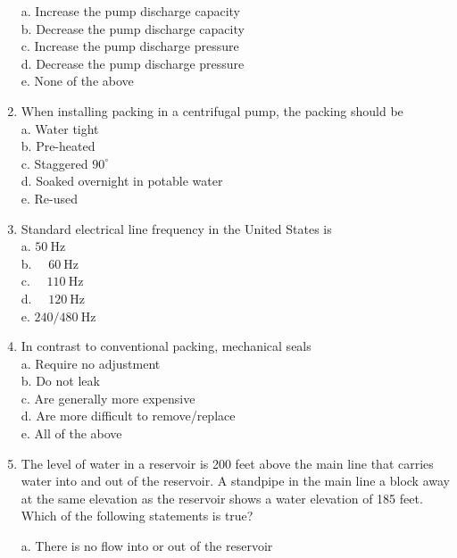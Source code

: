 \begin{enumerate}[1.]
a. Increase the pump discharge capacity\\

b. Decrease the pump discharge capacity\\

c. Increase the pump discharge pressure\\

d. Decrease the pump discharge pressure\\

e. None of the above

\item When installing packing in a centrifugal pump, the packing should be\\
a. Water tight\\
b. Pre-heated\\
c. Staggered $90^{\circ}$\\
d. Soaked overnight in potable water\\
e. Re-used\\

  \item Standard electrical line frequency in the United States is\\
a. $50 \mathrm{~Hz}$\\
b. $\quad 60 \mathrm{~Hz}$\\
c. $\quad 110 \mathrm{~Hz}$\\
d. $\quad 120 \mathrm{~Hz}$\\
e. $240 / 480 \mathrm{~Hz}$\\

\item In contrast to conventional packing, mechanical seals\\
a. Require no adjustment\\
b. Do not leak\\
c. Are generally more expensive\\
d. Are more difficult to remove/replace\\
e. All of the above\\

\item The level of water in a reservoir is 200 feet above the main line that carries water into and out of the reservoir. A standpipe in the main line a block away at the same elevation as the reservoir shows a water elevation of 185 feet. Which of the following statements is true?

a. There is no flow into or out of the reservoir\\


\end{enumerate}
